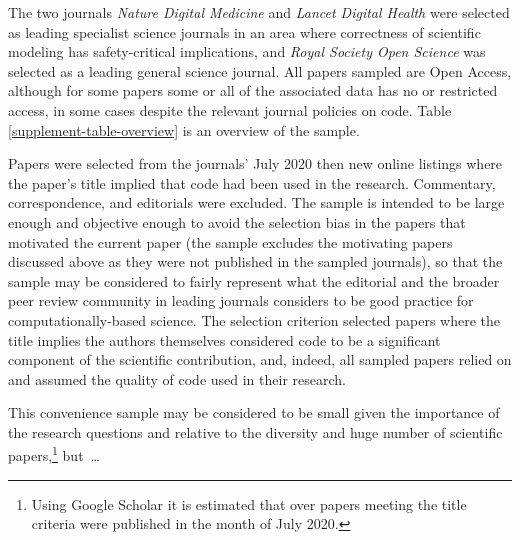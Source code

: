 \documentclass[10pt,a4paper]{article}
\begin{document}
The two journals \emph{Nature Digital Medicine\/} and \emph{Lancet Digital Health\/} were selected as leading specialist science journals in an area where correctness of scientific modeling has safety-critical implications, and \emph{Royal Society Open Science\/} was selected as a leading general science journal. All papers sampled are Open Access, although for some papers some or all of the associated data has no or restricted access, in some cases despite the relevant journal policies on code. Table \ref{supplement-table-overview} is an overview of the sample.  

Papers were selected from the journals' July 2020 then new online listings where the paper's title implied that code had been used in the research. Commentary, correspondence, and editorials were excluded. The sample is intended to be large enough and objective enough to avoid the selection bias in the papers that motivated the current paper (the sample excludes the motivating papers discussed above as they were not published in the sampled journals), so that the sample may be considered to fairly represent what the editorial and the broader peer review community in leading journals considers to be good practice for computationally-based science. The selection criterion selected papers where the title implies the authors themselves considered code to be a significant component of the scientific contribution, and, indeed, all sampled papers relied on and assumed the quality of code used in their research. 


This convenience sample may be considered to be small given the importance of the research questions and relative to the diversity and huge number of scientific papers,\footnote{Using Google Scholar it is estimated that over  papers meeting the title criteria were published in the month of July 2020.} but~\ldots
\end{document}

